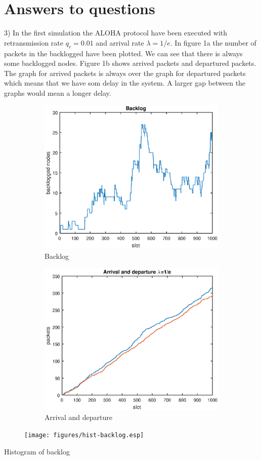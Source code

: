 \documentclass{article}
\begin{document}
\section{Answers to questions}
3) In the first simulation the ALOHA protocol have been executed with retransmission rate $q_r=0.01$ and arrival rate $\lambda=1/e$. In figure 1a the number of packets in the backlogged have been plotted. We can see that there is always some backlogged nodes. Figure 1b shows arrived packets and departured packets. The graph for arrived packets is always over the graph for departured packets which means that we have som delay in the system. A larger gap between the graphs would mean a longer delay.
\begin{figure}[h]
  \begin{subfigure}{.5\textwidth}
    \includegraphics[width=\textwidth]{figures/backlog.eps}
    \caption{Backlog}
    \label{fig:backlog}
  \end{subfigure}%
  \begin{subfigure}{.5\textwidth}
    \includegraphics[width=\textwidth]{figures/arrival-departure-einv.eps}
    \caption{Arrival and departure}
    \label{fig:arrival-departure}
  \end{subfigure}
  \caption{}
\end{figure}

\begin{figure}
  \texttt{[image: figures/hist-backlog.esp]}
\end{figure}
\caption{Histogram of backlog}
\end{document}

